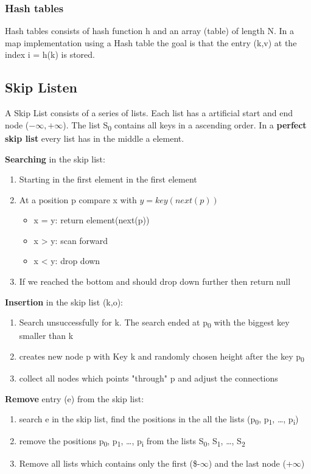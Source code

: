 \documentclass[11pt,twoside,landscape]{article}
\begin{document}
\begin{multicols}{2}
\subsubsection*{Hash tables}
\label{sec:org8e3afe3}
Hash tables consists of hash function h and an array (table) of length N. In a map implementation using a Hash table the goal is that the entry (k,v) at the index i = h(k) is stored.

\subsection*{Skip Listen}
\label{sec:orgf7b0435}
A Skip List consists of a series of lists. Each list  has a artificial start and end node (\(-\infty, +\infty\)). The list S\textsubscript{0} contains all keys in a ascending order. In a \textbf{perfect skip list} every list has in the middle a element.

\textbf{Searching} in the skip list:
\begin{enumerate}
\item Starting in the first element in the first element
\item At a position p compare x with \(y = key(next(p))\)
\begin{itemize}
\item x = y: return element(next(p))
\item x > y: scan forward
\item x < y: drop down
\end{itemize}
\item If we reached the bottom and should drop down further then return null
\end{enumerate}

\textbf{Insertion} in the skip list (k,o):
\begin{enumerate}
\item Search unsuccessfully for k. The search ended at p\textsubscript{0} with the biggest key smaller than k
\item creates new node p with Key k and randomly chosen height after the key p\textsubscript{0}
\item collect all nodes which points "through" p and adjust the connections
\end{enumerate}


\textbf{Remove} entry (e) from the skip list:
\begin{enumerate}
\item search e in the skip list, find the positions in the all the lists (p\textsubscript{0}, p\textsubscript{1}, \ldots{}, p\textsubscript{i})
\item remove the positions p\textsubscript{0}, p\textsubscript{1}, \ldots{}, p\textsubscript{i} from the lists S\textsubscript{0}, S\textsubscript{1}, \ldots{}, S\textsubscript{2}
\item Remove all lists which contains only the first (\$-\(\infty\)) and the last node (+\(\infty\))
\end{enumerate}



\end{multicols}
\end{document}
